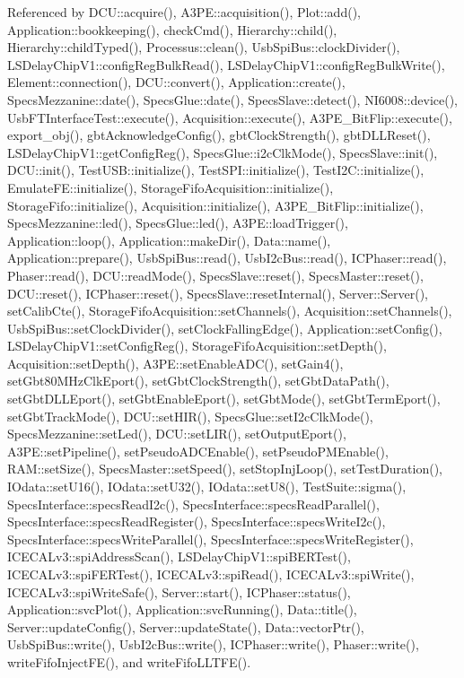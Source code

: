 Referenced by DCU::acquire(), A3PE::acquisition(), Plot::add(), Application::bookkeeping(), checkCmd(), Hierarchy::child(), Hierarchy::childTyped(), Processus::clean(), UsbSpiBus::clockDivider(), LSDelayChipV1::configRegBulkRead(), LSDelayChipV1::configRegBulkWrite(), Element::connection(), DCU::convert(), Application::create(), SpecsMezzanine::date(), SpecsGlue::date(), SpecsSlave::detect(), NI6008::device(), UsbFTInterfaceTest::execute(), Acquisition::execute(), A3PE\_\-BitFlip::execute(), export\_\-obj(), gbtAcknowledgeConfig(), gbtClockStrength(), gbtDLLReset(), LSDelayChipV1::getConfigReg(), SpecsGlue::i2cClkMode(), SpecsSlave::init(), DCU::init(), TestUSB::initialize(), TestSPI::initialize(), TestI2C::initialize(), EmulateFE::initialize(), StorageFifoAcquisition::initialize(), StorageFifo::initialize(), Acquisition::initialize(), A3PE\_\-BitFlip::initialize(), SpecsMezzanine::led(), SpecsGlue::led(), A3PE::loadTrigger(), Application::loop(), Application::makeDir(), Data::name(), Application::prepare(), UsbSpiBus::read(), UsbI2cBus::read(), ICPhaser::read(), Phaser::read(), DCU::readMode(), SpecsSlave::reset(), SpecsMaster::reset(), DCU::reset(), ICPhaser::reset(), SpecsSlave::resetInternal(), Server::Server(), setCalibCte(), StorageFifoAcquisition::setChannels(), Acquisition::setChannels(), UsbSpiBus::setClockDivider(), setClockFallingEdge(), Application::setConfig(), LSDelayChipV1::setConfigReg(), StorageFifoAcquisition::setDepth(), Acquisition::setDepth(), A3PE::setEnableADC(), setGain4(), setGbt80MHzClkEport(), setGbtClockStrength(), setGbtDataPath(), setGbtDLLEport(), setGbtEnableEport(), setGbtMode(), setGbtTermEport(), setGbtTrackMode(), DCU::setHIR(), SpecsGlue::setI2cClkMode(), SpecsMezzanine::setLed(), DCU::setLIR(), setOutputEport(), A3PE::setPipeline(), setPseudoADCEnable(), setPseudoPMEnable(), RAM::setSize(), SpecsMaster::setSpeed(), setStopInjLoop(), setTestDuration(), IOdata::setU16(), IOdata::setU32(), IOdata::setU8(), TestSuite::sigma(), SpecsInterface::specsReadI2c(), SpecsInterface::specsReadParallel(), SpecsInterface::specsReadRegister(), SpecsInterface::specsWriteI2c(), SpecsInterface::specsWriteParallel(), SpecsInterface::specsWriteRegister(), ICECALv3::spiAddressScan(), LSDelayChipV1::spiBERTest(), ICECALv3::spiFERTest(), ICECALv3::spiRead(), ICECALv3::spiWrite(), ICECALv3::spiWriteSafe(), Server::start(), ICPhaser::status(), Application::svcPlot(), Application::svcRunning(), Data::title(), Server::updateConfig(), Server::updateState(), Data::vectorPtr(), UsbSpiBus::write(), UsbI2cBus::write(), ICPhaser::write(), Phaser::write(), writeFifoInjectFE(), and writeFifoLLTFE().


